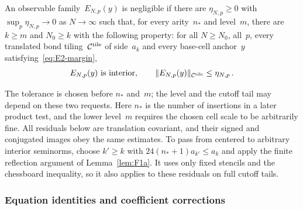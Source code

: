 \begin{definition}\label{def:E2-small}
An observable family~$E_{N,p}(y)$ is negligible if there are $\eta_{N,p}\ge0$ with $\sup_p\eta_{N,p}\to0$ as $N\to\infty$ such that, for every arity~$n_*$ and level~$m$, there are $k\ge m$ and $N_0\ge k$ with the following property: for all $N\ge N_0$, all~$p$, every translated bond tiling~$\mathcal C^{\rm tile}$ of side~$a_k$ and every base-cell anchor~$y$ satisfying~\eqref{eq:E2-margin},
\begin{equation*}
E_{N,p}(y)\text{ is interior},\qquad
\|E_{N,p}(y)\|_{\mathcal C^{\rm tile}}\le\eta_{N,p}\,.
\end{equation*}
\end{definition}
The tolerance is chosen before $n_*$ and~$m$; the level and the cutoff tail may depend on these two requests. Here $n_*$ is the number of insertions in a later product test, and the lower level~$m$ requires the chosen cell scale to be arbitrarily fine. All residuals below are translation covariant, and their signed and conjugated images obey the same estimates. To pass from centered to arbitrary interior seminorms, choose $k'\ge k$ with $24(n_*+1)a_{k'}\le a_k$ and apply the finite reflection argument of Lemma~\ref{lem:F1a}. It uses only fixed stencils and the chessboard inequality, so it also applies to these residuals on full cutoff tails.



\subsubsection{Equation identities and coefficient corrections}\label{sec:partII-E.2.4}

